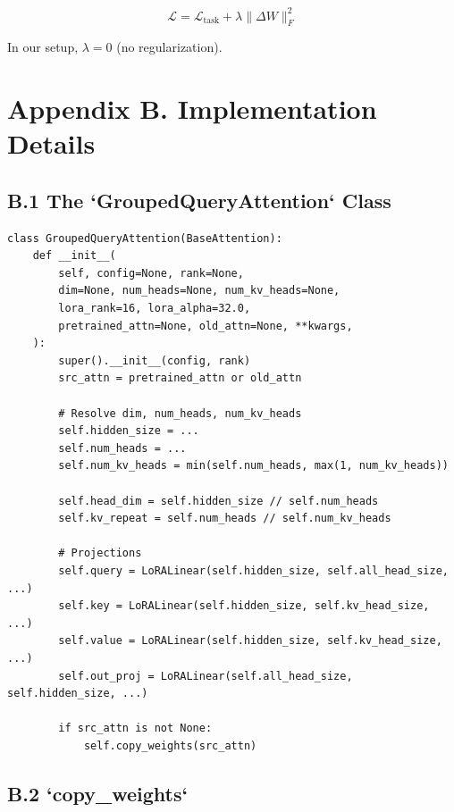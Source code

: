 \[
\mathcal{L} = \mathcal{L}_\text{task} + \lambda \|\Delta W\|_F^2
\tag{A.15}
\]

In our setup, $\lambda = 0$ (no regularization).


\section{Appendix B. Implementation Details}

\subsection{B.1 The `GroupedQueryAttention` Class}

\begin{lstlisting}
class GroupedQueryAttention(BaseAttention):
    def __init__(
        self, config=None, rank=None,
        dim=None, num_heads=None, num_kv_heads=None,
        lora_rank=16, lora_alpha=32.0,
        pretrained_attn=None, old_attn=None, **kwargs,
    ):
        super().__init__(config, rank)
        src_attn = pretrained_attn or old_attn
        
        # Resolve dim, num_heads, num_kv_heads
        self.hidden_size = ...
        self.num_heads = ...
        self.num_kv_heads = min(self.num_heads, max(1, num_kv_heads))
        
        self.head_dim = self.hidden_size // self.num_heads
        self.kv_repeat = self.num_heads // self.num_kv_heads
        
        # Projections
        self.query = LoRALinear(self.hidden_size, self.all_head_size, ...)
        self.key = LoRALinear(self.hidden_size, self.kv_head_size, ...)
        self.value = LoRALinear(self.hidden_size, self.kv_head_size, ...)
        self.out_proj = LoRALinear(self.all_head_size, self.hidden_size, ...)
        
        if src_attn is not None:
            self.copy_weights(src_attn)
\end{lstlisting}

\subsection{B.2 `copy\_weights`}


